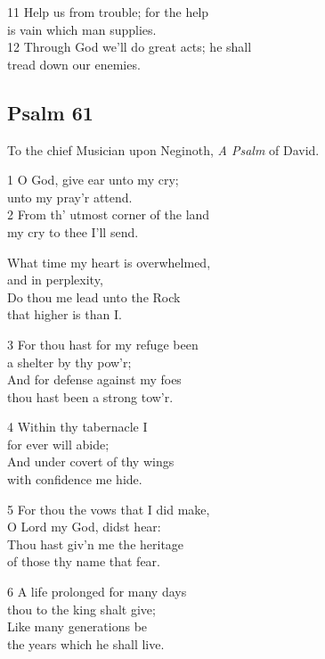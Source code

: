 11 Help us from trouble; for the help\\
is vain which man supplies.\\
12 Through God we’ll do great acts; he shall\\
tread down our enemies.



\begin{center}
\quad{}\quad{}
\end{center}

\subsection*{Psalm 61}

To the chief Musician upon Neginoth,
\emph{A Psalm} of David.

1 O God, give ear unto my cry;\\
unto my pray’r attend.\\
2 From th’ utmost corner of the land\\
my cry to thee I’ll send.

What time my heart is overwhelmed,\\
and in perplexity,\\
Do thou me lead unto the Rock\\
that higher is than I.

3 For thou hast for my refuge been\\
a shelter by thy pow’r;\\
And for defense against my foes\\
thou hast been a strong tow’r.

4 Within thy tabernacle I\\
for ever will abide;\\
And under covert of thy wings\\
with confidence me hide.

5 For thou the vows that I did make,\\
O Lord my God, didst hear:\\
Thou hast giv’n me the heritage\\
of those thy name that fear.

6 A life prolonged for many days\\
thou to the king shalt give;\\
Like many generations be\\
the years which he shall live.

